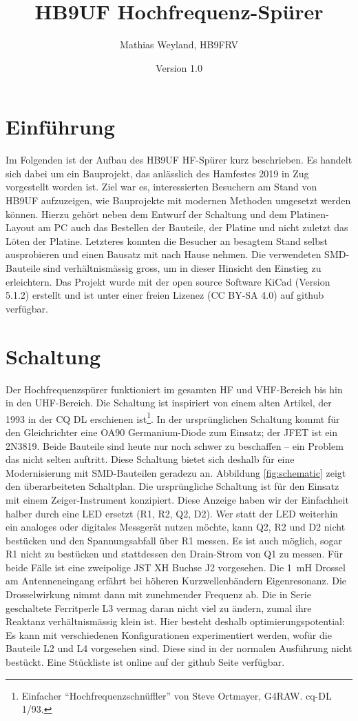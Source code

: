 \documentclass[a4paper,11pt,halfparskip,smallheadings,DIV=10]{scrartcl}
\title{HB9UF Hochfrequenz-Spürer}
\author{Mathias Weyland, HB9FRV}
\date{Version 1.0} %
\begin{document}
\maketitle
\vspace{-1.5cm}

\section{Einführung}
Im Folgenden ist der Aufbau des HB9UF HF-Spürer kurz beschrieben. Es handelt
sich dabei um ein Bauprojekt, das anlässlich des Hamfestes 2019 in Zug
vorgestellt worden ist. Ziel war es, interessierten Besuchern am Stand von
HB9UF aufzuzeigen, wie Bauprojekte mit modernen Methoden umgesetzt werden
können. Hierzu gehört neben dem Entwurf der Schaltung und dem Platinen-Layout
am PC auch das Bestellen der Bauteile, der Platine und nicht zuletzt das
Löten der Platine. Letzteres konnten die Besucher an besagtem Stand selbst
ausprobieren und einen Bausatz mit nach Hause nehmen. Die verwendeten
SMD-Bauteile sind verhältnismässig gross, um in dieser Hinsicht den
Einstieg zu erleichtern. Das Projekt wurde mit der open source Software
KiCad (Version 5.1.2) erstellt und ist unter einer freien Lizenez
(CC BY-SA 4.0) auf github verfügbar.

\section{Schaltung}
Der Hochfrequenzspürer funktioniert im gesamten HF und VHF-Bereich bis
hin in den UHF-Bereich. Die Schaltung ist inspiriert von einem alten
Artikel, der 1993 in der CQ DL erschienen ist\footnote{Einfacher
``Hochfrequenzschnüffler'' von Steve Ortmayer, G4RAW. cq-DL 1/93.}. In der
ursprünglichen Schaltung kommt für den Gleichrichter eine OA90 Germanium-Diode
zum Einsatz; der JFET ist ein 2N3819. Beide Bauteile sind heute nur noch schwer
zu beschaffen -- ein Problem das nicht selten auftritt. Diese Schaltung bietet
sich deshalb für eine Modernisierung mit SMD-Bauteilen geradezu an. Abbildung
\ref{fig:schematic} zeigt den überarbeiteten Schaltplan. Die ursprüngliche
Schaltung ist für den Einsatz mit einem Zeiger-Instrument konzipiert. Diese
Anzeige haben wir der Einfachheit halber durch eine LED ersetzt (R1, R2, Q2, D2).
Wer statt der LED weiterhin ein analoges oder digitales Messgerät nutzen
möchte, kann Q2, R2 und D2 nicht bestücken und den Spannungsabfall über
R1 messen. Es ist auch möglich, sogar R1 nicht zu bestücken und stattdessen
den Drain-Strom von Q1 zu messen. Für beide Fälle ist eine zweipolige JST XH
Buchse J2 vorgesehen. Die 1~mH Drossel am Antenneneingang erfährt bei höheren
Kurzwellenbändern Eigenresonanz. Die Drosselwirkung nimmt dann mit zunehmender
Frequenz ab. Die in Serie geschaltete Ferritperle L3 vermag daran nicht viel
zu ändern, zumal ihre Reaktanz verhältnismässig klein ist. Hier besteht deshalb
optimierungspotential: Es kann mit verschiedenen Konfigurationen experimentiert
werden, wofür die Bauteile L2 und L4 vorgesehen sind. Diese sind in der
normalen Ausführung nicht bestückt. Eine Stückliste ist online auf der github %
Seite verfügbar.
\end{document}
